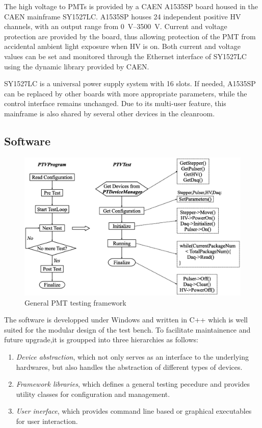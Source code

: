 \documentclass[5p, times]{elsarticle}
\begin{document}
The high voltage to PMTs is provided by a CAEN A1535SP board housed in the CAEN mainframe SY1527LC. 
A1535SP houses 24 independent positive HV channels, with an output range from \SIrange{0}{3500}{\volt}.
Current and voltage protection are provided by the board, thus allowing protection of the PMT from accidental ambient light exposure when HV is on.
Both current and voltage values can be set and monitored through the Ethernet interface of SY1527LC using the dynamic library provided by CAEN.

SY1527LC is a universal power supply system with 16 slots.
If needed, A1535SP can be replaced by other boards with more appropriate parameters, while the control interface remains unchanged.
Due to its multi-user feature, this mainframe is also shared by several other devices in the cleanroom.

\subsection{Software}
\label{sec:software}

\begin{figure}[b]
\centering
 \includegraphics[width=140mm]{software_framework}
\caption{General PMT testing framework}
\label{fig:software_framework}
\end{figure}

The software is developped under Windows and written in C++ which is well suited for the modular design of the test bench.
To facilitate maintainence and future upgrade,it is groupped into three hierarchies as follows:
\begin{enumerate}
 \item \textit{Device abstraction}, which not only serves as an interface to the underlying hardwares, but also handles the abstraction of different types of devices. 
 \item \textit{Framework libraries}, which defines a general testing pecedure and provides utility classes for configuration and management.
 \item \textit{User inerface}, which provides command line based or graphical executables for user interaction. 
\end{enumerate}
\end{document}
